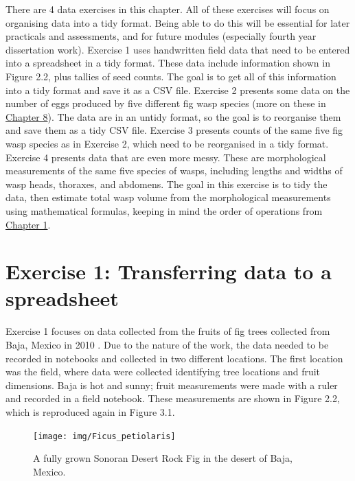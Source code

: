 \documentclass[
]{scrbook}
\begin{document}
There are 4 data exercises in this chapter.
All of these exercises will focus on organising data into a tidy format.
Being able to do this will be essential for later practicals and assessments, and for future modules (especially fourth year dissertation work).
Exercise 1 uses handwritten field data that need to be entered into a spreadsheet in a tidy format.
These data include information shown in Figure 2.2, plus tallies of seed counts.
The goal is to get all of this information into a tidy format and save it as a CSV file.
Exercise 2 presents some data on the number of eggs produced by five different fig wasp species (more on these in \protect\hyperlink{Chapter_8}{Chapter 8}).
The data are in an untidy format, so the goal is to reorganise them and save them as a tidy CSV file.
Exercise 3 presents counts of the same five fig wasp species as in Exercise 2, which need to be reorganised in a tidy format.
Exercise 4 presents data that are even more messy.
These are morphological measurements of the same five species of wasps, including lengths and widths of wasp heads, thoraxes, and abdomens.
The goal in this exercise is to tidy the data, then estimate total wasp volume from the morphological measurements using mathematical formulas, keeping in mind the order of operations from \protect\hyperlink{Chapter_1}{Chapter 1}.

\hypertarget{exercise-1-transferring-data-to-a-spreadsheet}{%
\section{Exercise 1: Transferring data to a spreadsheet}\label{exercise-1-transferring-data-to-a-spreadsheet}}

Exercise 1 focuses on data collected from the fruits of fig trees collected from Baja, Mexico in 2010 \citep{Duthie2015b, Duthie2016}.
Due to the nature of the work, the data needed to be recorded in notebooks and collected in two different locations.
The first location was the field, where data were collected identifying tree locations and fruit dimensions.
Baja is hot and sunny; fruit measurements were made with a ruler and recorded in a field notebook.
These measurements are shown in Figure 2.2, which is reproduced again in Figure 3.1.

\begin{figure}
\texttt{[image: img/Ficus\_petiolaris]} \caption{A fully grown Sonoran Desert Rock Fig in the desert of Baja, Mexico.}\label{fig:unnamed-chunk-11}
\end{figure}
\end{document}
